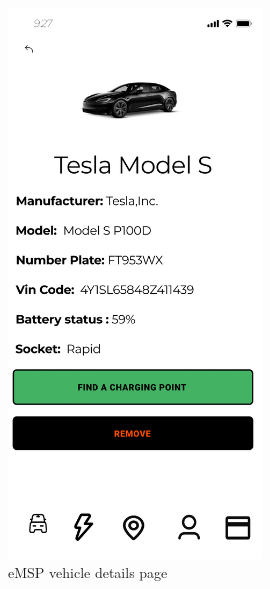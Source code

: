 \documentclass{Configuration_Files/PoliMi3i_thesis}
\begin{document}
\begin{figure}[H]
    \centering
    \includegraphics[width=0.6\textwidth]{Images/user-interface/emsp/eMSP (1)-07.png}
    \caption{eMSP vehicle details page}
\end{figure}
\end{document}
